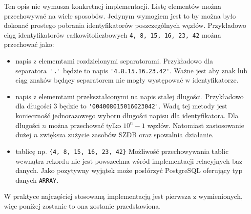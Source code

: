 Ten opis nie wymusza konkretnej implementacji.
Listę elementów można przechowywać na wiele sposobów.
Jedynym wymogiem jest to by można było dokonać prostego pobrania identyfikatorów poszczególnych węzłów.
Przykładowo ciąg identyfikatorów całkowitoliczbowych \texttt{4, 8, 15, 16, 23, 42} można przechować jako:
\begin{itemize}
 \item napis z elememtami rozdzielonymi separatorami. 
    Przykładowo dla separatora~\verb|'.'| będzie to napis \verb|'4.8.15.16.23.42'|. 
    Ważne jest aby znak lub ciąg znaków będący separatorem nie mogły występować w identyfikatorze.
 \item napis z elememtami przekształconymi na napis stałej długości. 
    Przykładowo dla długości 3 będzie to \verb|'004008015016023042'|.
    Wadą tej metody jest konieczność jednorazowego wyboru długości napisu dla identyfikatora.
    Dla długości $n$ można przechować tylko $10^n-1$ węzłów. %
    Natomiast zastosowanie dużej $n$ zwiększa zużycie zasobów SZDB oraz spowalnia działanie.
 \item tablicę  np. \verb|{4, 8, 15, 16, 23, 42}|
    Możliwość przechowywania tablic wewnątrz rekordu nie jest powszechna wśród implementacji relacyjnych baz danych.
    Jako pozytywny wyjątek może posłórzyć PostgreSQL oferujący typ danych \verb|ARRAY|.
\end{itemize}

W praktyce najczęściej stosowaną implementacją jest pierwsza z wymienionych,
więc poniżej zostanie to ona zostanie przedstawiona.








